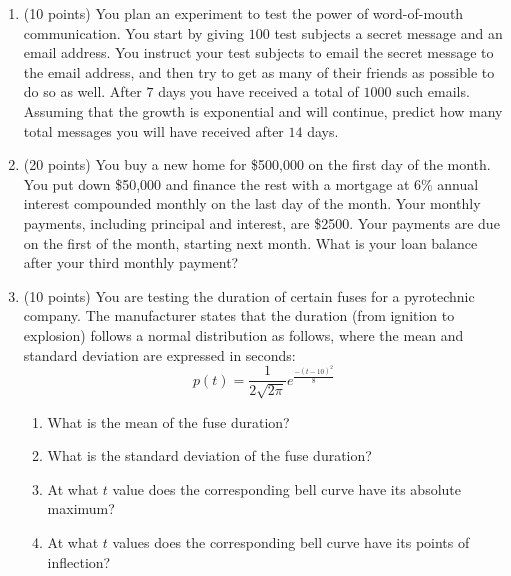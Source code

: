 \documentclass[letterpaper,12pt,fleqn]{article}
\begin{document}
\begin{enumerate}[left=0pt]

\item (10 points) You plan an experiment to test the power of word-of-mouth communication.  You start by giving
  \(100\) test subjects a secret message and an email address.  You instruct your test subjects to email the secret
  message to the email address, and then try to get as many of their friends as possible to do so as well.  After
  \(7\) days you have received a total of \(1000\) such emails.  Assuming that the growth is exponential and will
  continue, predict how many total messages you will have received after \(14\) days.

  \newpage

\item (20 points) You buy a new home for \$500,000 on the first day of the month.  You put down \$50,000 and
  finance the rest with a mortgage at 6\% annual interest compounded monthly on the last day of the month.  Your
  monthly payments, including principal and interest, are \$2500.  Your payments are due on the first of the month,
  starting next month.  What is your loan balance after your third monthly payment?

  \newpage

\item (10 points) You are testing the duration of certain fuses for a pyrotechnic company.  The manufacturer states
  that the duration (from ignition to explosion) follows a normal distribution as follows, where the mean and
  standard deviation are expressed in seconds:
  \[p(t)=\frac{1}{2\sqrt{2\pi}}e^{\frac{-(t-10)^2}{8}}\]
  \begin{enumerate}
  \item What is the mean of the fuse duration?

    \vspace{1in}
    
  \item What is the standard deviation of the fuse duration?

    \vspace{1in}
    
  \item At what \(t\) value does the corresponding bell curve have its absolute maximum?

    \vspace{1in}
    
  \item At what \(t\) values does the corresponding bell curve have its points of inflection?


\end{enumerate}
\end{enumerate}
\end{document}
